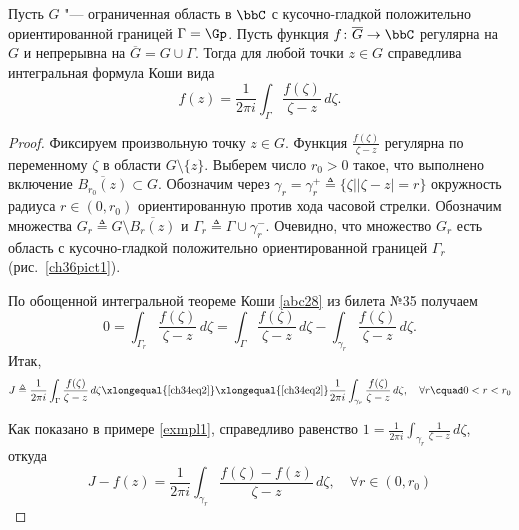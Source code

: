 \begin{thm} \label{ch34thm1}
Пусть $G$ "--- ограниченная область в $\bbC$ с кусочно-гладкой положительно ориентированной границей $\Gamma= \Gp$. Пусть функция $f\colon \overline{G}\to \bbC$ регулярна на $G$ и непрерывна на $\overline{G}=G\cup\Gamma$. Тогда для любой точки $z\in G$ справедлива интегральная формула Коши вида
 \begin{equation} \label{ch34eq1}
 f(z) = \frac{1}{2\pi i}\int_\Gamma \frac{f(\zeta)}{\zeta - z}\,d\zeta.
 \end{equation}
\end{thm}
\begin{proof} Фиксируем произвольную точку $z \in G$. Функция $\frac{f(\zeta)}{\zeta - z}$ регулярна по переменному $\zeta$ в области $G \setminus \{z\}$. Выберем число $r_0 > 0$ такое, что выполнено включение $\overline{B_{r_0}(z)}\subset G$. 
\newpage%
Обозначим через $\gamma_r=\gamma_r^{+} \triangleq \{ \zeta \bigl| |\zeta - z| = r \}$ окружность радиуса $r \in (0, r_0)$ ориентированную против хода часовой стрелки. Обозначим множества $G_r \triangleq G \setminus \overline{B_r(z)}$ и $\Gamma_r \triangleq \Gamma \cup \gamma_r^{-}$. Очевидно, что множество $G_r$ есть область с кусочно-гладкой положительно ориентированной границей $\Gamma_r$(рис.~\ref{ch36pict1}). 

По обощенной интегральной теореме Коши \ref{abc28} из билета №35 получаем
\begin{equation} \label{ch34eq2}
 0 = \int_{\Gamma_r} \frac{f(\zeta)}{\zeta - z}\,d\zeta = \int_\Gamma \frac{f(\zeta)}{\zeta - z}\,d\zeta - \int_{\gamma_r} \frac{f(\zeta)}{\zeta - z}\,d\zeta.
\end{equation}
Итак,
\begin{equation} \label{ch34eq3}
J \triangleq \frac{1}{2\pi i} \int_\Gamma \frac{f(\zeta)}{\zeta - z}\,d\zeta \xlongequal{\eqref{ch34eq2}}\xlongequal{\eqref{ch34eq2}} \frac{1}{2\pi i} \int_{\gamma_r} \frac{f(\zeta)}{\zeta - z}\,d\zeta,  \quad  \forall r\cquad 0 < r < r_0
\end{equation}

Как показано в примере \ref{exmpl1}, справедливо равенство $1 = \frac{1}{2\pi i} \int_{\gamma_r} \frac{1}{\zeta - z}\,d\zeta$, откуда 
$$
J - f(z) = \frac{1}{2\pi i} \int_{\gamma_r} \frac{f(\zeta) - f(z)}{\zeta - z}\,d\zeta, \quad  \forall r \in (0,r_0)
$$


\end{proof}
